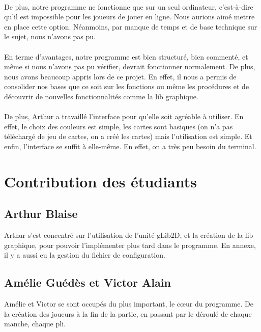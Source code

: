 \documentclass[12pt]{report}
\begin{document}
\paragraph{} De plus, notre programme ne fonctionne que sur un seul ordinateur, c’est-à-dire qu’il est impossible pour les joueurs de jouer en ligne. Nous aurions aimé mettre en place cette option. Néanmoins, par manque de temps et de base technique sur le sujet, nous n’avons pas pu. \\
\paragraph{} En terme d’avantages, notre programme est bien structuré, bien commenté, et même si nous n’avons pas pu vérifier, devrait fonctionner normalement. De plus, nous avons beaucoup appris lors de ce projet. En effet, il nous a permis de consolider nos bases que ce soit sur les fonctions ou même les procédures et de découvrir de nouvelles fonctionnalités comme la lib graphique. \\
\paragraph{} De plus, Arthur a travaillé l’interface pour qu’elle soit agréable à utiliser. En effet, le choix des couleurs est simple, les cartes sont basiques (on n’a pas téléchargé de jeu de cartes, on a créé les cartes) mais l’utilisation est simple. Et enfin, l’interface se suffit à elle-même. En effet, on a très peu besoin du terminal.

\clearpage
\section{Contribution des étudiants}
\subsection*{Arthur Blaise}
	Arthur s'est concentré sur l'utilisation de l'unité gLib2D, et la création de la lib graphique, pour pouvoir l'implémenter plus tard dans le programme. En annexe, il y a aussi eu la gestion du fichier de configuration.
	
\subsection*{Amélie Guédès et Victor Alain}
 Amélie et Victor se sont occupés du plus important, le cœur du programme. De la création des joueurs à la fin de la partie, en passant par le déroulé de chaque manche, chaque pli. 
 
\end{document}
